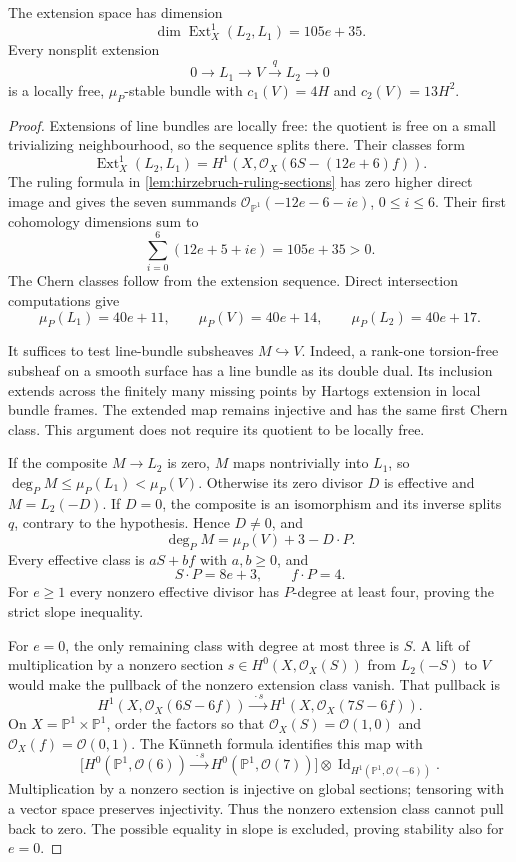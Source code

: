 \begin{proposition}\label{prop:hirzebruch-stable-extensions}
The extension space has dimension
\[
 \dim\operatorname{Ext}^1_X(L_2,L_1)=105e+35.
\]
Every nonsplit extension
\[
 0\longrightarrow L_1\longrightarrow V\xrightarrow{q}L_2
 \longrightarrow0
\]
is a locally free, $\mu_P$-stable bundle with
$c_1(V)=4H$ and $c_2(V)=13H^2$.
\end{proposition}
\begin{proof}
Extensions of line bundles are locally free: the quotient is free on a
small trivializing neighbourhood, so the sequence splits there. Their
classes form
\[
 \operatorname{Ext}^1_X(L_2,L_1)
 =H^1(X,\mathcal O_X(6S-(12e+6)f)).
\]
The ruling formula in \cref{lem:hirzebruch-ruling-sections} has zero
higher direct image and gives the seven summands
$\mathcal O_{\mathbb P^1}(-12e-6-ie)$, $0\leq i\leq6$.
Their first cohomology dimensions sum to
\[
 \sum_{i=0}^6(12e+5+ie)=105e+35>0.
\]
The Chern classes follow from the extension sequence. Direct intersection
computations give
\[
 \mu_P(L_1)=40e+11,\qquad \mu_P(V)=40e+14,
 \qquad \mu_P(L_2)=40e+17.
\]

It suffices to test line-bundle subsheaves $M\hookrightarrow V$.
Indeed, a rank-one torsion-free subsheaf on a smooth surface has a line
bundle as its double dual. Its inclusion extends across the finitely
many missing points by Hartogs extension in local bundle frames.
The extended map remains injective and has the same first Chern class.
This argument does not require its quotient to be locally free.

If the composite $M\to L_2$ is zero, $M$ maps nontrivially into $L_1$,
so $\deg_P M\leq\mu_P(L_1)<\mu_P(V)$. Otherwise its zero divisor $D$
is effective and $M=L_2(-D)$. If $D=0$, the composite is an isomorphism
and its inverse splits $q$, contrary to the hypothesis. Hence $D\neq0$,
and
\[
 \deg_P M=\mu_P(V)+3-D\cdot P.
\]
Every effective class is $aS+bf$ with $a,b\geq0$, and
\[
 S\cdot P=8e+3,\qquad f\cdot P=4.
\]
For $e\geq1$ every nonzero effective divisor has $P$-degree at least
four, proving the strict slope inequality.

For $e=0$, the only remaining class with degree at most three is $S$.
A lift of multiplication by a nonzero section
$s\in H^0(X,\mathcal O_X(S))$ from $L_2(-S)$ to $V$ would make the
pullback of the nonzero extension class vanish. That pullback is
\[
 H^1(X,\mathcal O_X(6S-6f))
 \xrightarrow{\ \cdot s\ }H^1(X,\mathcal O_X(7S-6f)).
\]
On $X=\mathbb P^1\times\mathbb P^1$, order the factors so that
$\mathcal O_X(S)=\mathcal O(1,0)$ and $\mathcal O_X(f)=\mathcal O(0,1)$.
The K\"unneth formula identifies this map with
\[
 \bigl[H^0(\mathbb P^1,\mathcal O(6))
 \xrightarrow{\ \cdot s\ }H^0(\mathbb P^1,\mathcal O(7))\bigr]
 \otimes\operatorname{Id}_{H^1(\mathbb P^1,\mathcal O(-6))}.
\]
Multiplication by a nonzero section is injective on global sections;
tensoring with a vector space preserves injectivity. Thus the nonzero
extension class cannot pull back to zero. The possible equality in slope
is excluded, proving stability also for $e=0$.
\end{proof}

